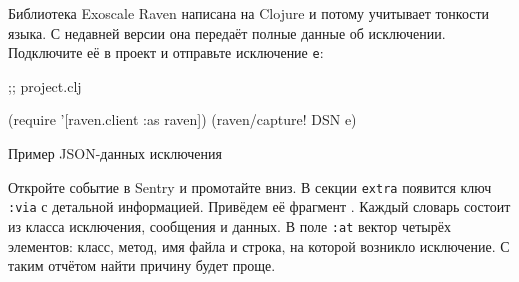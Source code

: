 Библиотека Exoscale Raven написана на Clojure и потому учитывает тонкости
языка. С недавней версии она передаёт полные данные об
исключении. Подключите её в проект и отправьте исключение \verb|e|:

\begin{english}
  \begin{clojure}
 ;; project.clj

(require '[raven.client :as raven])
(raven/capture! DSN e)
  \end{clojure}
\end{english}

\begin{listing}[ht!]

\ifx\DEVICETYPE\MOBILE

\begin{english}
  \begin{json}
  \end{json}
\end{english}

\else

\begin{english}
  \begin{json}
  \end{json}
\end{english}

\fi

  \caption{Пример JSON-данных исключения}
  \label{fig:ex-json-data}
\end{listing}

Откройте событие в Sentry и промотайте вниз. В секции \verb|extra| появится ключ
\verb|:via| с детальной информацией. Привёдем её фрагмент .
Каждый словарь состоит из класса исключения, сообщения и данных. В поле \verb|:at|
вектор четырёх элементов: класс, метод, имя файла и строка, на которой возникло
исключение. С таким отчётом найти причину будет проще.

